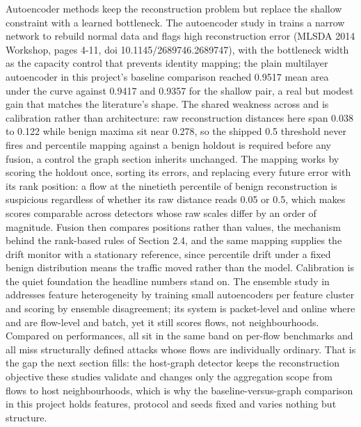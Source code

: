 Autoencoder methods keep the reconstruction problem but replace the shallow constraint with a learned bottleneck. The autoencoder study in \cite{k12} trains a narrow network to rebuild normal data and flags high reconstruction error (MLSDA 2014 Workshop, pages 4-11, doi 10.1145/2689746.2689747), with the bottleneck width as the capacity control that prevents identity mapping; the plain multilayer autoencoder in this project's baseline comparison reached 0.9517 mean area under the curve against 0.9417 and 0.9357 for the shallow pair, a real but modest gain that matches the literature's shape. The shared weakness across \cite{k12} and \cite{k11} is calibration rather than architecture: raw reconstruction distances here span 0.038 to 0.122 while benign maxima sit near 0.278, so the shipped 0.5 threshold never fires and percentile mapping against a benign holdout is required before any fusion, a control the graph section inherits unchanged. The mapping works by scoring the holdout once, sorting its errors, and replacing every future error with its rank position: a flow at the ninetieth percentile of benign reconstruction is suspicious regardless of whether its raw distance reads 0.05 or 0.5, which makes scores comparable across detectors whose raw scales differ by an order of magnitude. Fusion then compares positions rather than values, the mechanism behind the rank-based rules of Section 2.4, and the same mapping supplies the drift monitor with a stationary reference, since percentile drift under a fixed benign distribution means the traffic moved rather than the model. Calibration is the quiet foundation the headline numbers stand on. The ensemble study in \cite{k13} addresses feature heterogeneity by training small autoencoders per feature cluster and scoring by ensemble disagreement; its system is packet-level and online where \cite{k12} and \cite{k11} are flow-level and batch, yet it still scores flows, not neighbourhoods. Compared on performances, all sit in the same band on per-flow benchmarks and all miss structurally defined attacks whose flows are individually ordinary. That is the gap the next section fills: the host-graph detector keeps the reconstruction objective these studies validate and changes only the aggregation scope from flows to host neighbourhoods, which is why the baseline-versus-graph comparison in this project holds features, protocol and seeds fixed and varies nothing but structure.

